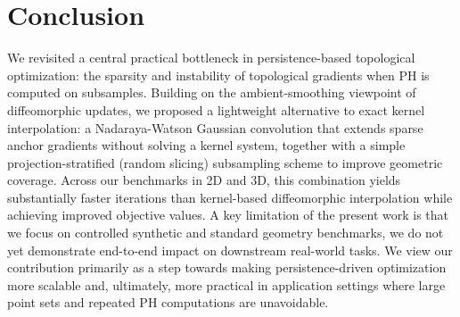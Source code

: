 \documentclass{article} %
\theoremstyle{plain}
\theoremstyle{definition}
\theoremstyle{remark}
\begin{document}
\section{Conclusion}
We revisited a central practical bottleneck in persistence-based topological optimization: the sparsity and instability of topological gradients when PH is computed on subsamples. Building on the ambient-smoothing viewpoint of diffeomorphic
updates, we proposed a lightweight alternative to exact kernel interpolation: a Nadaraya-Watson Gaussian convolution that extends sparse anchor gradients without solving a kernel system, together with a simple projection-stratified (random slicing) subsampling scheme to improve geometric coverage. Across our benchmarks in 2D and 3D, this combination yields substantially faster iterations than kernel-based diffeomorphic interpolation while achieving improved objective values. A key limitation of the present work is that we focus on controlled synthetic and standard geometry benchmarks, we do not yet demonstrate end-to-end impact on downstream real-world tasks. We view our contribution primarily as a step towards making persistence-driven optimization more scalable and, ultimately, more practical in application settings where large point sets and repeated PH computations are unavoidable.

\clearpage

\end{document}
